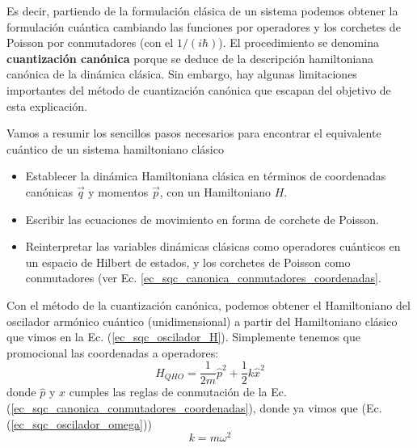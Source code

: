         Es decir, partiendo de la formulación clásica de un sistema podemos obtener la formulación cuántica cambiando las funciones por operadores y los corchetes de Poisson por conmutadores (con el $1/(i \hbar)$). El procedimiento se denomina \textbf{cuantización canónica} porque se deduce de la descripción hamiltoniana canónica de la dinámica clásica. Sin embargo, hay algunas limitaciones importantes del método de cuantización canónica que escapan del objetivo de esta explicación. 
        
        Vamos a resumir los sencillos pasos necesarios para encontrar el equivalente cuántico de un sistema hamiltoniano clásico
        \begin{itemize}
            \item Establecer la dinámica Hamiltoniana clásica en términos de coordenadas canónicas $\vec{q}$ y momentos $\vec{p}$, con un Hamiltoniano $H$.

            \item Escribir las ecuaciones de movimiento en forma de corchete de Poisson.

            \item Reinterpretar las variables dinámicas clásicas como operadores cuánticos en un espacio de Hilbert de estados, y los corchetes de Poisson como conmutadores (ver Ec. \ref{ec_sqc_canonica_conmutadores_coordenadas}. %
        \end{itemize}





        Con el método de la cuantización canónica, podemos obtener el Hamiltoniano del oscilador armónico cuántico (unidimensional) a partir del Hamiltoniano clásico que vimos en la Ec. (\ref{ec_sqc_oscilador_H}). Simplemente tenemos que promocional las coordenadas a operadores:
        \begin{equation} \label{ec_sqc_canonica_oscilador_H}
            \hat{H}_{QHO} = \frac{1}{2m} \hat{p}^2 + \frac{1}{2} k \hat{x}^2  
        \end{equation}
        donde $\hat{p}$ y $\hat{x}$ cumples las reglas de conmutación de la Ec. (\ref{ec_sqc_canonica_conmutadores_coordenadas}), donde ya vimos que (Ec. (\ref{ec_sqc_oscilador_omega}))
        \begin{equation}
            k = m \omega^2 
        \end{equation}

